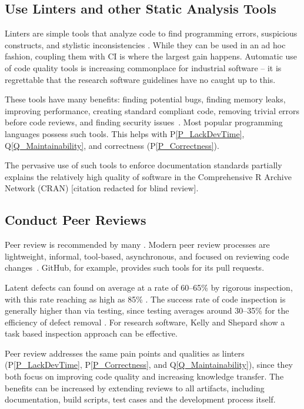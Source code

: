 \documentclass[doubleblind,12pt, 3p, times]{elsarticle}
\newcommand{\ppref}[1]{P\ref{#1}}
\newcommand{\qref}[1]{Q\ref{#1}}
\begin{document}
\subsection{Use Linters and other Static Analysis Tools} \label{Sec_Linters}

Linters are simple tools that analyze code to find programming errors,
suspicious constructs, and stylistic inconsistencies \cite{Wikipedia2022_Lint}.
While they can be used in an ad hoc fashion, coupling them with CI is where
the largest gain happens. Automatic use of code quality tools is increasing
commonplace for industrial software -- it is regrettable that the
research software guidelines have no caught up to this.

These tools have many benefits: finding potential bugs, finding memory
leaks, improving performance, creating standard compliant code,
removing trivial errors before code reviews, and finding security
issues~\cite{SourceLevel2022_Lint}. Most popular programming languages possess
such tools. This helps with \ppref{P_LackDevTime}, \qref{Q_Maintainability},
and correctness (\ppref{P_Correctness}).

The pervasive use of such tools to enforce documentation standards partially
explains the relatively high quality of software in the Comprehensive R Archive
Network (CRAN) [citation redacted for blind review].

\subsection{Conduct Peer Reviews} \label{Sec_PeerReview}

Peer review is recommended by many \cite{HerouxEtAl2008,
OrvizEtAl2017, USGS2019}. Modern peer review processes are lightweight,
informal, tool-based, asynchronous, and focused
on reviewing code changes~\cite{SadowskiEtAl2018}. GitHub, for example,
provides such tools for its pull requests.

Latent defects can found on average at a rate of 60--65\% by rigorous
inspection, with this rate reaching as high as 85\% \cite{Jones2008}. The
success rate of code inspection is generally higher than via testing, since testing
averages around 30--35\% for the efficiency of defect removal \cite{EbertAndJones2009,
Jones2008}. For research software, Kelly and Shepard \cite{KellyAndShepard2000}
show a task based inspection approach can be effective.

Peer review addresses the same pain points and qualities as linters
(\ppref{P_LackDevTime}, \ppref{P_Correctness}, and \qref{Q_Maintainability}),
since they both focus on improving code quality and increasing knowledge
transfer.  The benefits can be increased by extending reviews to all artifacts,
including documentation, build scripts, test cases and the development process
itself.
\end{document}
